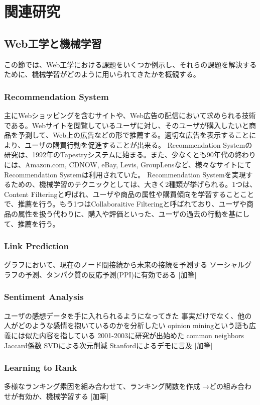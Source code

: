 \chapter{関連研究}
\section{Web工学と機械学習}
この節では、Web工学における課題をいくつか例示し、それらの課題を解決するために、機械学習がどのように用いられてきたかを概観する。
\subsection{Recommendation System}
主にWebショッピングを含むサイトや、Web広告の配信において求められる技術である。Webサイトを閲覧しているユーザに対し、そのユーザが購入したいと商品を予測して、Web上の広告などの形で推薦する。適切な広告を表示することにより、ユーザの購買行動を促進することが出来る。
Recommendation Systemの研究は、1992年のTapestryシステムに始まる\cite{goldberg}。また、少なくとも90年代の終わりには、Amazon.com, CDNOW, eBay, Levis, GroupLensなど、様々なサイトにてRecommendation Systemは利用されていた\cite{Resnick:1997:RS:245108.245121,Schafer:1999:RSE:336992.337035}。
Recommendation Systemを実現するための、機械学習のテクニックとしては、大きく2種類が挙げられる\cite{Koren:2009:MFT:1608565.1608614}。1つは、Content Filteringと呼ばれ、ユーザや商品の属性や購買傾向を学習することことで、推薦を行う。もう1つはCollaboraitive Filteringと呼ばれており、ユーザや商品の属性を扱う代わりに、購入や評価といった、ユーザの過去の行動を基にして、推薦を行う。
\subsection{Link Prediction}
グラフにおいて、現在のノード間接続から未来の接続を予測する
ソーシャルグラフの予測、タンパク質の反応予測(PPI)に有効である
[加筆]
\subsection{Sentiment Analysis}
ユーザの感想データを手に入れられるようになってきた
事実だけでなく、他の人がどのような感情を抱いているのかを分析したい
opinion miningという語も広義には似た内容を指している
2001-2003に研究が出始めた
common neighbors
Jaccard係数 SVDによる次元削減
Stanfordによるデモに言及
[加筆]
\subsection{Learning to Rank}
多様なランキング素因を組み合わせて、ランキング関数を作成
→どの組み合わせが有効か、機械学習する
[加筆]
